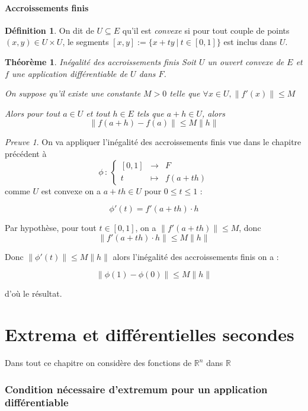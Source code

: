 \documentclass[]{article}
\newtheorem{mythm}{Théorème}
\theoremstyle{remark}
\newtheorem{myproof}{Preuve}
\theoremstyle{definition}
\newtheorem{mydef}{Définition}
\newcommand{\func}[5]{
#1 \, : \, \left\{ \begin{array}{lcl}
	#2 & \longrightarrow & #3 \\
	#4 & \longmapsto & #5
\end{array}
\right.
}
\begin{document}
\subsection{Accroissements finis}

\begin{mydef}
	On dit de $U \subseteq E$ qu'il est \textit{convexe} si pour tout couple de points $(x, y) \in U \times U$, le segments $[x, y] := \{x + t y ~ | ~ t \in [0, 1]\}$ est inclus dans $U$.
\end{mydef}

\begin{mythm} Inégalité des accroissements finis
	Soit $U$ un ouvert convexe de $E$ et $f$ une application différentiable de $U$ dans $F$.
	
	On suppose qu'il existe une constante $M > 0$ telle que $\forall x \in U, \|f'(x)\| \leqslant M$
	
	Alors pour tout $a \in U$ et tout $h \in E$ tels que $a + h \in U$, alors $$\|f(a+h) - f(a)\| \leqslant M \|h\|$$
\end{mythm}

\begin{myproof}
	On va appliquer l'inégalité des accroissements finis vue dans le chapitre précédent à $$\func{\phi}{[0, 1]}{F}{t}{f(a+th)}$$ comme $U$ est convexe on a $a + th \in U$ pour $0 \leqslant t \leqslant 1$ :
	
	$$\phi'(t) = f'(a+th) \cdot h$$
	
	Par hypothèse, pour tout $t \in [0, 1]$, on a $\|f'(a+th)\| \leqslant M$, donc $$\|f'(a+th) \cdot h\|\leqslant M \|h\|$$
	
	Donc $\|\phi'(t)\| \leqslant M \|h\|$ alors l'inégalité des accroissements finis on a :
	
	$$\|\phi(1) - \phi(0)\| \leqslant M \|h\|$$
	
	d'où le résultat.
\end{myproof}

\part{Extrema et différentielles secondes}

Dans tout ce chapitre on considère des fonctions de $\mathbb{R}^n$ dans $\mathbb{R}$

\section{Condition nécessaire d'extremum pour un application différentiable}
\end{document}
